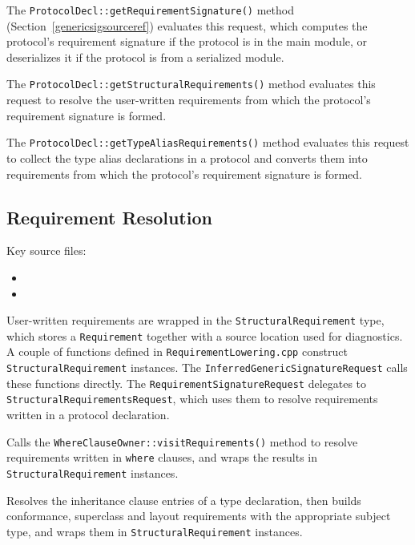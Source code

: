 \documentclass[../generics]{subfiles}
\begin{document}
The \texttt{ProtocolDecl::getRequirementSignature()} method (Section~\ref{genericsigsourceref}) evaluates this request, which computes the protocol's requirement signature if the protocol is in the main module, or deserializes it if the protocol is from a serialized module.

The \texttt{ProtocolDecl::getStructuralRequirements()} method evaluates this request to resolve the user-written requirements from which the protocol's requirement signature is formed.

The \texttt{ProtocolDecl::getTypeAliasRequirements()} method evaluates this request to collect the type alias declarations in a protocol and converts them into requirements from which the protocol's requirement signature is formed.

\subsection*{Requirement Resolution}

Key source files:
\begin{itemize}
\item {}
\item {}
\end{itemize}

User-written requirements are wrapped in the \texttt{StructuralRequirement} type, which stores a \texttt{Requirement} together with a source location used for diagnostics. A couple of functions defined in \texttt{RequirementLowering.cpp} construct \texttt{StructuralRequirement} instances. The \texttt{InferredGenericSignatureRequest} calls these functions directly. The \texttt{RequirementSignatureRequest} delegates to \texttt{StructuralRequirementsRequest}, which uses them to resolve requirements written in a protocol declaration.

Calls the \texttt{WhereClauseOwner::visitRequirements()} method to resolve requirements written in \texttt{where} clauses, and wraps the results in \texttt{StructuralRequirement} instances.

Resolves the inheritance clause entries of a type declaration, then builds conformance, superclass and layout requirements with the appropriate subject type, and wraps them in \texttt{StructuralRequirement} instances.
\end{document}
